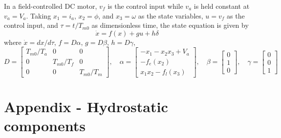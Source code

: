 \documentclass[11pt,a4paper,oneside]{book}
\numberwithin{equation}{section}
\theoremstyle{it}
\theoremstyle{definition}
\begin{document}
In a field-controlled DC motor, $v_f$ is the control input while $v_a$ is held constant at $v_a=V_a$. Taking $x_1=i_a$, $x_2=\phi$, and $x_3=\omega$ as the state variables, $u=v_f$ as the control input, and $\tau=t/T_{m0}$ as dimensionless time, the state equation is given by
\begin{equation}
	\dot{x}=f(x)+gu+h\delta
\end{equation}
where $\dot{x}=dx/d\tau$, $f=D\alpha$, $g=D\beta$, $h=D\gamma$,
\begin{equation*}
	D=\begin{bmatrix} T_{m0}/T_a & 0 & 0 \\[6pt] 0 & T_{m0}/T_f & 0 \\[6pt] 0 & 0 & T_{m0}/T_m \end{bmatrix},\quad
	\alpha=\begin{bmatrix} -x_1-x_2x_3+V_a \\[6pt] -f_e(x_2) \\[6pt] x_1x_2-f_l(x_3)\end{bmatrix},\quad
	\beta=\begin{bmatrix} 0 \\[6pt] 1 \\[6pt] 0\end{bmatrix},\quad
	\gamma=\begin{bmatrix} 0 \\[6pt] 0 \\[6pt] 1\end{bmatrix}
\end{equation*}






\chapter{Appendix - Hydrostatic components}
\end{document}
